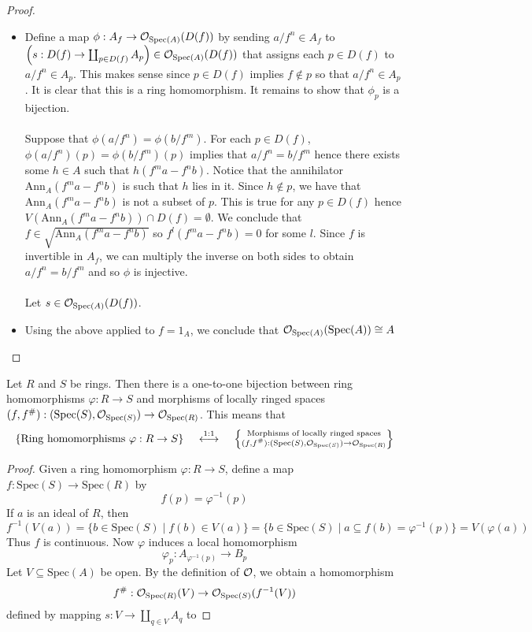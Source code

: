 \documentclass[a4paper]{article}
\begin{document}
\begin{prp}{}{}
\begin{proof}
\begin{itemize}
\item Define a map $\phi:A_f\to\mathcal{O}_{\text{Spec}(A)}(D(f))$ by sending $a/f^n\in A_f$ to $\left(s:D(f)\to\coprod_{p\in D(f)}A_p\right)\in\mathcal{O}_{\text{Spec}(A)}(D(f))$ that assigns each $p\in D(f)$ to $a/f^n\in A_p$. This makes sense since $p\in D(f)$ implies $f\notin p$ so that $a/f^n\in A_p$. It is clear that this is a ring homomorphism. It remains to show that $\phi_p$ is a bijection. \\~\\

Suppose that $\phi(a/f^n)=\phi(b/f^m)$. For each $p\in D(f)$, $\phi(a/f^n)(p)=\phi(b/f^m)(p)$ implies that $a/f^n=b/f^m$ hence there exists some $h\in A$ such that $h(f^ma-f^nb)$. Notice that the annihilator $\text{Ann}_A(f^ma-f^nb)$ is such that $h$ lies in it. Since $h\notin p$, we have that $\text{Ann}_A(f^ma-f^nb)$ is not a subset of $p$. This is true for any $p\in D(f)$ hence $V(\text{Ann}_A(f^ma-f^nb))\cap D(f)=\emptyset$. We conclude that $f\in\sqrt{\text{Ann}_A(f^ma-f^nb)}$ so $f^l(f^ma-f^nb)=0$ for some $l$. Since $f$ is invertible in $A_f$, we can multiply the inverse on both sides to obtain $a/f^n=b/f^m$ and so $\phi$ is injective. \\~\\

Let $s\in\mathcal{O}_{\text{Spec}(A)}(D(f))$. 

\item Using the above applied to $f=1_A$, we conclude that $\mathcal{O}_{\text{Spec}(A)}(\text{Spec}(A))\cong A$
\end{itemize}
\end{proof}
\end{prp}

\begin{prp}{}{} Let $R$ and $S$ be rings. Then there is a one-to-one bijection between ring homomorphisms $\varphi:R\to S$ and morphisms of locally ringed spaces $(f,f^\#):(\text{Spec}(S),\mathcal{O}_{\text{Spec}(S)})\to\mathcal{O}_{\text{Spec}(R)}$. This means that $$\left\{\text{Ring homomorphisms }\varphi:R\to S\right\}\;\;\;\;\overset{1:1}{\longleftrightarrow}\;\;\;\;\left\{\substack{\text{Morphisms of locally ringed spaces}\\(f,f^\#):(\text{Spec}(S),\mathcal{O}_{\text{Spec}(S)})\to\mathcal{O}_{\text{Spec}(R)}}\right\}$$ \tcbline
\begin{proof}
Given a ring homomorphism $\varphi:R\to S$, define a map $f:\text{Spec}(S)\to\text{Spec}(R)$ by $$f(p)=\varphi^{-1}(p)$$ If $a$ is an ideal of $R$, then $$f^{-1}(V(a))=\{b\in\text{Spec}(S)\;|\;f(b)\in V(a)\}=\{b\in\text{Spec}(S)\;|\;a\subseteq f(b)=\varphi^{-1}(p)\}=V(\varphi(a))$$ Thus $f$ is continuous. Now $\varphi$ induces a local homomorphism $$\varphi_p:A_{\varphi^{-1}(p)}\to B_p$$ Let $V\subseteq\text{Spec}(A)$ be open. By the definition of $\mathcal{O}$, we obtain a homomorphism $$f^\#:\mathcal{O}_{\text{Spec}(R)}(V)\to\mathcal{O}_{\text{Spec}(S)}(f^{-1}(V))$$ defined by mapping $s:V\to\coprod_{q\in V}A_q$ to 
\end{proof}
\end{prp}
\end{document}
